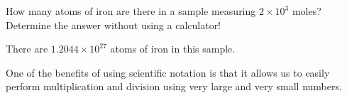 

How many atoms of iron are there in a sample measuring $2 \times 10^3$ moles?  Determine the answer without using a calculator!







There are $1.2044 \times 10^{27}$ atoms of iron in this sample.







One of the benefits of using scientific notation is that it allows us to easily perform multiplication and division using very large and very small numbers.




